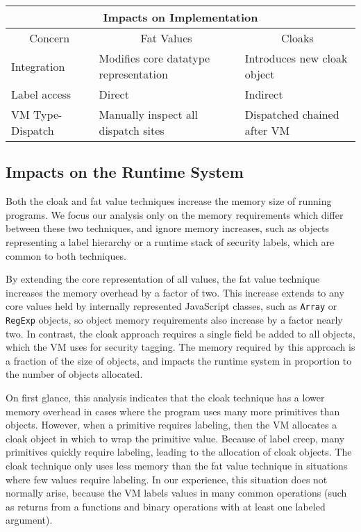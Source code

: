 \documentclass[11pt,onecolumn]{article}
\newcommand{\code}[1]{\texttt{#1}}
\begin{document}
\medskip
\begin{adjustwidth}{-1in}{-1in}
\begin{center}
\begin{tabular}{l|l|l}
\toprule
\multicolumn{3}{c}{Impacts on Implementation} \\
\midrule
\multicolumn{1}{c}{Concern} & \multicolumn{1}{|c|}{Fat Values} & \multicolumn{1}{c}{Cloaks} \\
\midrule
Integration      & Modifies core datatype representation & Introduces new cloak object \\
Label access     & Direct & Indirect \\
VM Type-Dispatch & Manually inspect all dispatch sites & Dispatched chained after VM \\
\bottomrule
\end{tabular}
\end{center}
\end{adjustwidth}
\medskip

\subsection{Impacts on the Runtime System}

Both the cloak and fat value techniques increase the memory size of running programs.
We focus our analysis only on the memory requirements which differ between these two techniques, and ignore memory increases, such as objects representing a label hierarchy or a runtime stack of security labels, which are common to both techniques.

By extending the core representation of all values, the fat value technique increases the memory overhead by a factor of two.
This increase extends to any core values held by internally represented JavaScript classes, such as \code{Array} or \code{RegExp} objects, so object memory requirements also increase by a factor nearly two.
In contrast, the cloak approach requires a single field be added to all objects, which the VM uses for security tagging.
The memory required by this approach is a fraction of the size of objects, and impacts the runtime system in proportion to the number of objects allocated.

On first glance, this analysis indicates that the cloak technique has a lower memory overhead in cases where the program uses many more primitives than objects.
However, when a primitive requires labeling, then the VM allocates a cloak object in which to wrap the primitive value.
Because of label creep, many primitives quickly require labeling, leading to the allocation of cloak objects.
The cloak technique only uses less memory than the fat value technique in situations where few values require labeling.
In our experience, this situation does not normally arise, because the VM labels values in many common operations (such as returns from a functions and binary operations with at least one labeled argument).
\end{document}
